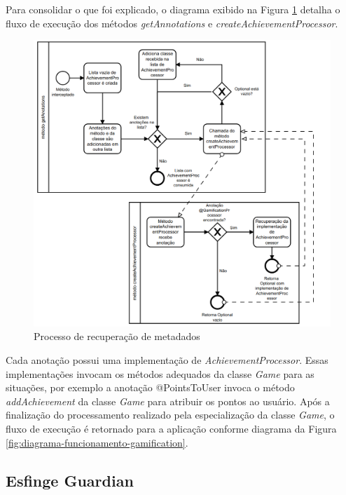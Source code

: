 \par Para consolidar o que foi explicado, o diagrama exibido na Figura \ref{fig:processo-recuperacao-achievement-processor} detalha o fluxo de execução dos métodos \textit{getAnnotations} e \textit{createAchievementProcessor}.

\begin{figure}[H]
    \centering
    \includegraphics[scale=0.5]{src/imagens/cap2/bpmn-recuperacao-achievement-processor.png}
    \caption{Processo de recuperação de metadados}
    \label{fig:processo-recuperacao-achievement-processor}
\end{figure}

\par Cada anotação possui uma implementação de \textit{AchievementProcessor}. Essas implementações invocam os métodos adequados da classe  \textit{Game} para as situações, por exemplo a anotação @PointsToUser invoca o método \textit{addAchievement} da classe \textit{Game} para atribuir os pontos ao usuário. Após a finalização do processamento realizado pela especialização da classe \textit{Game}, o fluxo de execução é retornado para a aplicação conforme diagrama da Figura \ref{fig:diagrama-funcionamento-gamification}.

\subsection{Esfinge Guardian}

